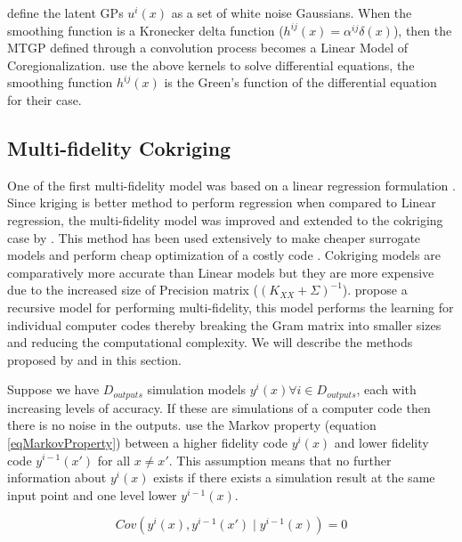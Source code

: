 \cite{Boyle05dependentgaussian} define the latent GPs $u^{i}(x)$ as a set of white noise Gaussians. When the smoothing function is a Kronecker delta function ($h^{ij}(x) = \alpha^{ij}\delta(x)$), then the MTGP defined through a convolution process becomes a Linear Model of Coregionalization. \cite{journals/jmlr/AlvarezLL09} use the above kernels to solve differential equations, the smoothing function $h^{ij}(x)$ is the Green's function of the differential equation for their case.  

\subsection{Multi-fidelity Cokriging}\label{secMultiFidelityMTGP}
One of the first multi-fidelity model was based on a linear regression formulation \cite{craig1998constructing, goldstein2007bayes}. Since kriging is better method to perform regression when compared to Linear regression, the multi-fidelity model was improved and extended to the cokriging case by \cite{kennedy2000predicting, o1998markov}. This method has been used extensively to make cheaper surrogate models and perform cheap optimization of a costly code \cite{forrester2007multi, march2012provably}. Cokriging models are comparatively more accurate than Linear models but they are more expensive due to the increased size of Precision matrix ($(K_{XX} + \Sigma)^{-1}$). \cite{le2013multi} propose a recursive model for performing multi-fidelity, this model performs the learning for individual computer codes thereby breaking the Gram matrix into smaller sizes and reducing the computational complexity. We will describe the methods proposed by \cite{o1998markov} and \cite{le2013multi} in this section. 

Suppose we have $D_{outputs}$ simulation models $y^{i}(x) \forall i \in D_{outputs}$, each with increasing levels of accuracy. If these are simulations of a computer code then there is no noise in the outputs. \cite{o1998markov} use the Markov property (equation \ref{eqMarkovProperty}) between a higher fidelity code $y^{i}(x)$ and lower fidelity code $y^{i-1}(x')$ for all $x \neq x'$. This assumption means that no further information about $y^{i}(x)$ exists if there exists a simulation result at the same input point and one level lower $y^{i-1}(x)$. 

\begin{equation}\label{eqMarkovProperty}
         Cov(y^{i}(x), y^{i-1}(x') \mid y^{i-1}(x)) = 0
\end{equation}

